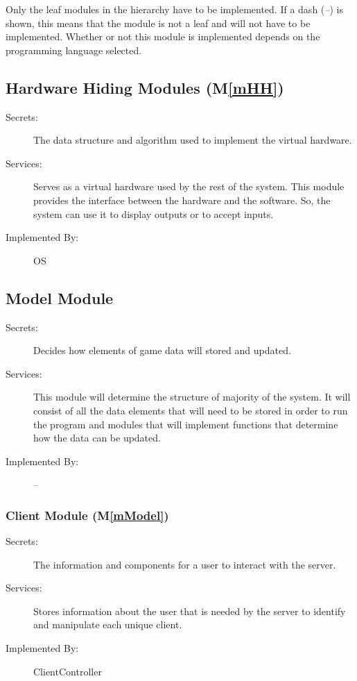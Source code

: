 \documentclass[12pt, titlepage]{article}
\newcommand{\mref}[1]{M\ref{#1}}
\begin{document}
Only the leaf modules in the
hierarchy have to be implemented. If a dash (\emph{--}) is shown, this means
that the module is not a leaf and will not have to be implemented. Whether or
not this module is implemented depends on the programming language
selected.

\subsection{Hardware Hiding Modules (\mref{mHH})}

\begin{description}
\item[Secrets:]The data structure and algorithm used to implement the virtual
  hardware.
\item[Services:]Serves as a virtual hardware used by the rest of the
  system. This module provides the interface between the hardware and the
  software. So, the system can use it to display outputs or to accept inputs.
\item[Implemented By:] OS
\end{description}


\subsection{Model Module}
    \begin{description}
    \item[Secrets:] Decides how elements of game data will stored and updated.
    \item[Services:] This module will determine the structure of majority of the system. It will consist of all the data elements that will need to be stored in order to run the program and modules that will implement functions that determine how the data can be updated.
    \item[Implemented By:] --
    \end{description}

\subsubsection{ Client Module (\mref{mModel})}
    \begin{description}
    \item[Secrets:] The information and components for a user to interact with the server.
    \item[Services:] Stores information about the user that is needed by the server to identify and manipulate each unique client.
    \item[Implemented By:] ClientController
    \end{description}
\end{document}
